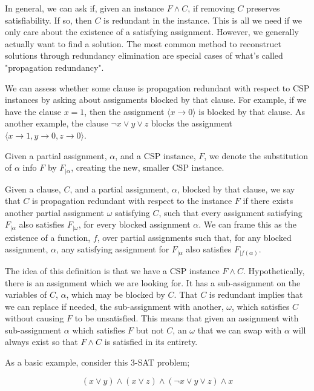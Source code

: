 In general, we can ask if, given an instance $F \wedge C$, if removing $C$ preserves satisfiability. If so, then $C$ is redundant in the instance. This is all we need if we only care about the existence of a satisfying assignment. However, we generally actually want to find a solution. The most common method to reconstruct solutions through redundancy elimination are special cases of what's called "propagation redundancy".

We can assess whether some clause is propagation redundant with respect to CSP instances by asking about assignments blocked by that clause. For example, if we have the clause $x = 1$, then the assignment $\langle x \rightarrow 0\rangle$ is blocked by that clause. As another example, the clause $\neg x \vee y \vee z$ blocks the assignment $\langle x \rightarrow 1, y \rightarrow 0, z \rightarrow 0\rangle$.

Given a partial assignment, $\alpha$, and a CSP instance, $F$, we denote the substitution of $\alpha$ info $F$ by $F_{|\alpha}$, creating the new, smaller CSP instance.

Given a clause, $C$, and a partial assignment, $\alpha$, blocked by that clause, we say that $C$ is propagation redundant with respect to the instance $F$ if there exists another partial assignment $\omega$ satisfying $C$, such that every assignment satisfying $F_{|\alpha}$ also satisfies $F_{|\omega}$, for every blocked assignment $\alpha$. We can frame this as the existence of a function, $f$, over partial assignments such that, for any blocked assignment, $\alpha$, any satisfying assignment for $F_{|\alpha}$ also satisfies $F_{|f(\alpha)}$.

The idea of this definition is that we have a CSP instance $F \wedge C$. Hypothetically, there is an assignment which we are looking for. It has a sub-assignment on the variables of $C$, $\alpha$, which may be blocked by $C$. That $C$ is redundant implies that we can replace if needed, the sub-assignment with another, $\omega$, which satisfies $C$ without causing $F$ to be unsatisfied. This means that given an assignment with sub-assignment $\alpha$ which satisfies $F$ but not $C$, an $\omega$ that we can swap with $\alpha$ will always exist so that $F \wedge C$ is satisfied in its entirety.

As a basic example, consider this 3-SAT problem;

\begin{equation}\label{equation:two-sat-example-pt1-2}
    (x \lor y) \land (x \lor z) \land (\neg x \lor y \lor z) \land x
\end{equation}


